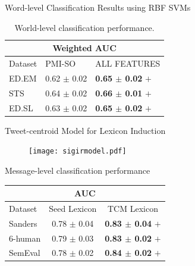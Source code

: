 \documentclass[handout]{beamer}
\begin{document}
\begin{frame}{Word-level Classification Results using RBF SVMs}
\footnotesize
\begin{table}[!htb]
\begin{center}
\begin{tabular}{l|l|l}
\hline \hline
\multicolumn{ 3}{c}{Weighted AUC } \\ \hline \hline
Dataset & PMI-SO & ALL FEATURES \\ \hline
ED.EM & 0.62 $\pm$ 0.02 &  \textbf{0.65 $\pm$ 0.02} $+$ \\  
STS & 0.64 $\pm$ 0.02 & \textbf{0.66 $\pm$ 0.01} $+$   \\ 
ED.SL &  0.63 $\pm$ 0.02 & \textbf{0.65  $\pm$  0.02} $+$ \\ \hline 
\end{tabular}
\end{center}
\caption{World-level classification performance.} 
\label{tab:classres}
\end{table}
\end{frame}







\begin{frame}{Tweet-centroid Model for Lexicon Induction}

\begin{figure}[htb]
	\centering
	 \texttt{[image: sigirmodel.pdf]}
\end{figure}



\end{frame}




\begin{frame}{Message-level classification performance}
\begin{scriptsize}
 \begin{table}[htbp]
\scriptsize
\begin{center}
\begin{tabular}{l|c|c}
\hline \hline
\multicolumn{ 3}{c}{AUC} \\ \hline \hline
Dataset & Seed Lexicon  & TCM Lexicon \\ \hline
Sanders & 0.78 $\pm$ 0.04 & \textbf{0.83 $\pm$ 0.04} $+$ \\ 
6-human & 0.79 $\pm$ 0.03 & \textbf{0.83 $\pm$ 0.02} $+$ \\ 
SemEval & 0.78 $\pm$ 0.02 & \textbf{0.84 $\pm$ 0.02} $+$ \\ \hline
\end{tabular}
\end{center}
\end{table}
\end{scriptsize}
\end{frame}
\end{document}
